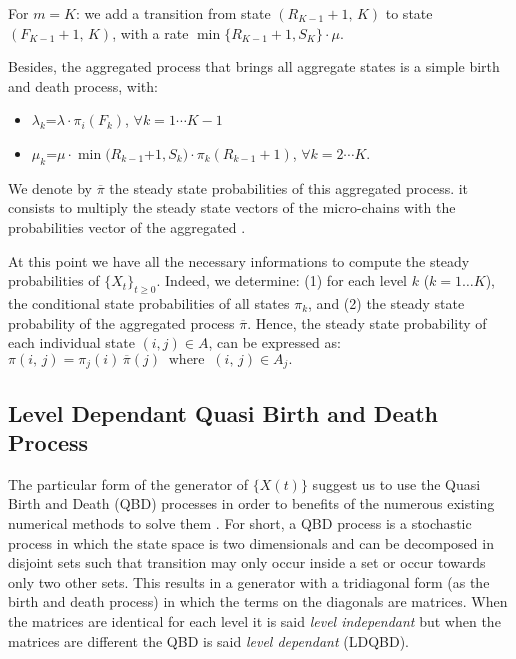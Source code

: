 \documentclass[conference]{IEEEtran}
\begin{document}
For $m=K$: we add a transition from state $(R_{K-1}+1,\, K)$ to state $(F_{K-1}+1,\,K)$, with a rate $\min\{R_{K-1}+1,S_K\} \cdot \mu$.

Besides, the aggregated process that brings all aggregate states is a simple birth and death process, with:
\begin{itemize} %
\item $\lambda_{k}$=$\lambda \cdot \pi_{i}(F_{k})$,\;\; $\forall k=1\cdots K-1$ 
\item $\mu_{k}$=$ \mu \cdot \min(R_{k-1}$+$1,S_k) \cdot \pi_{k}(R_{k-1} + \!1)$,\; $\forall k=2\cdots K$.
\end{itemize}
We denote by $\overline{\pi}$ the steady state probabilities of this aggregated process.
it consists to multiply the steady state vectors of the micro-chains with  the probabilities vector of the aggregated .


At this point we have all the necessary informations to compute the steady probabilities of $\{X_{t}\}_{t \geq 0}$. 
Indeed, we determine: (1) for each level $k$ ($k=1\ldots K$), the conditional state probabilities of all states $\pi_k$, 
and (2) the steady state probability of the aggregated process $\overline{\pi}$. 
Hence, the steady state probability of each individual state $(i,j)\in A$,  can be expressed as:
\(
\pi(i,\,j)=\pi_j(i)\,\overline{\pi}(j)\;\; \mbox{where} \;\; (i,\,j)\in A_j.
\)


\subsection{Level Dependant Quasi Birth and Death Process}

The particular form of the generator of $\{X(t)\}$ suggest us to use the Quasi Birth and Death (QBD) processes in order to benefits of the numerous
existing numerical methods to solve them \cite{Neuts1981}. For short, a QBD process is a stochastic process in which the state space is two dimensionals 
and can be decomposed in disjoint sets such that transition may only occur inside a set or occur towards only two other sets.
This results in a generator with a tridiagonal form (as the birth and death process) in which the terms on the diagonals are matrices.
When the matrices are identical for each level it is said \emph{level independant} but when the matrices are different the QBD
is said \emph{level dependant} (LDQBD).
\end{document}
